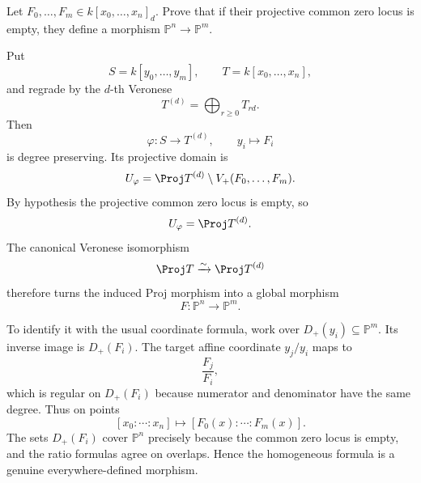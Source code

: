 \begin{problem}\label{prob:vi38-04}
Let \(F_0,\ldots,F_m\in k[x_0,\ldots,x_n]_d\).  Prove that if their projective common zero locus is empty, they define a morphism \(\mathbb P^n\to\mathbb P^m\).
\end{problem}

\ifdefined\FullProblemDossiers
\begin{solution}
Put
\[
S=k[y_0,\ldots,y_m],
\qquad
T=k[x_0,\ldots,x_n],
\]
and regrade by the \(d\)-th Veronese
\[
T^{(d)}=\bigoplus_{r\ge0}T_{rd}.
\]
Then
\[
\varphi:S\longrightarrow T^{(d)},
\qquad y_i\longmapsto F_i
\]
is degree preserving.  Its projective domain is
\[
U_\varphi
=
\Proj T^{(d)}\setminus V_+(F_0,\ldots,F_m).
\]
By hypothesis the projective common zero locus is empty, so
\[
U_\varphi=\Proj T^{(d)}.
\]
The canonical Veronese isomorphism
\[
\Proj T\xrightarrow{\sim}\Proj T^{(d)}
\]
therefore turns the induced Proj morphism into a global morphism
\[
F:\mathbb P^n\longrightarrow\mathbb P^m.
\]

To identify it with the usual coordinate formula, work over
\(D_+(y_i)\subseteq\mathbb P^m\).  Its inverse image is \(D_+(F_i)\).  The target
affine coordinate \(y_j/y_i\) maps to
\[
\frac{F_j}{F_i},
\]
which is regular on \(D_+(F_i)\) because numerator and denominator have the same
degree. Thus on points
\[
\boxed{[x_0:\cdots:x_n]\longmapsto
[F_0(x):\cdots:F_m(x)]}.
\]
The sets \(D_+(F_i)\) cover \(\mathbb P^n\) precisely because the common zero locus
is empty, and the ratio formulas agree on overlaps.  Hence the homogeneous formula
is a genuine everywhere-defined morphism.
\end{solution}
\fi
